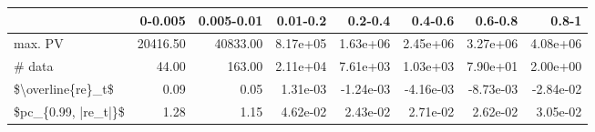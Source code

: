 \begin{tabular}{lrrrrrrr}
\toprule
{} &   0-0.005 &  0.005-0.01 &  0.01-0.2 &   0.2-0.4 &   0.4-0.6 &   0.6-0.8 &     0.8-1 \\
\midrule
max. PV             &  20416.50 &    40833.00 &  8.17e+05 &  1.63e+06 &  2.45e+06 &  3.27e+06 &  4.08e+06 \\
\# data              &     44.00 &      163.00 &  2.11e+04 &  7.61e+03 &  1.03e+03 &  7.90e+01 &  2.00e+00 \\
\$\textbackslash overline\{re\}\_t\$   &      0.09 &        0.05 &  1.31e-03 & -1.24e-03 & -4.16e-03 & -8.73e-03 & -2.84e-02 \\
\$pc\_\{0.99, |re\_t|\}\$ &      1.28 &        1.15 &  4.62e-02 &  2.43e-02 &  2.71e-02 &  2.62e-02 &  3.05e-02 \\
\bottomrule
\end{tabular}

